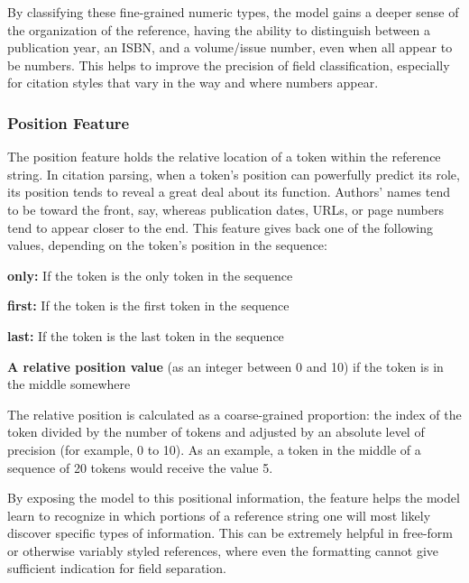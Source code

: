 By classifying these fine-grained numeric types, the model gains a deeper sense of the organization of the reference, having the ability to distinguish between a publication year, an ISBN, and a volume/issue number, even when all appear to be numbers. This helps to improve the precision of field classification, especially for citation styles that vary in the way and where numbers appear.

\subsubsection{Position Feature}
The position feature holds the relative location of a token within the reference string. In citation parsing, when a token's position can powerfully predict its role, its position tends to reveal a great deal about its function. Authors' names tend to be toward the front, say, whereas publication dates, URLs, or page numbers tend to appear closer to the end.
This feature gives back one of the following values, depending on the token's position in the sequence:
\begin{compactitem}
\item \textbf{only:} If the token is the only token in the sequence
\item \textbf{first:} If the token is the first token in the sequence
\item \textbf{last:} If the token is the last token in the sequence
\item \textbf{A relative position value} (as an integer between 0 and 10) if the token is in the middle somewhere
\end{compactitem}
The relative position is calculated as a coarse-grained proportion: the index of the token divided by the number of tokens and adjusted by an absolute level of precision (for example, 0 to 10). As an example, a token in the middle of a sequence of 20 tokens would receive the value 5.

By exposing the model to this positional information, the feature helps the model learn to recognize in which portions of a reference string one will most likely discover specific types of information. This can be extremely helpful in free-form or otherwise variably styled references, where even the formatting cannot give sufficient indication for field separation.

